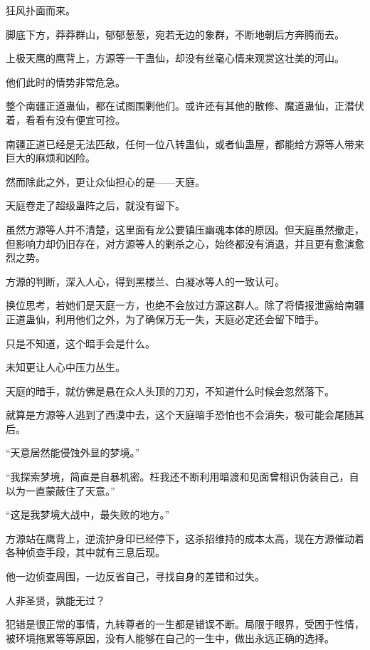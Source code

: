 
\begin{this_body}



狂风扑面而来。

脚底下方，莽莽群山，郁郁葱葱，宛若无边的象群，不断地朝后方奔腾而去。

上极天鹰的鹰背上，方源等一干蛊仙，却没有丝毫心情来观赏这壮美的河山。

他们此时的情势非常危急。

整个南疆正道蛊仙，都在试图围剿他们。或许还有其他的散修、魔道蛊仙，正潜伏着，看看有没有便宜可捡。

南疆正道已经是无法匹敌，任何一位八转蛊仙，或者仙蛊屋，都能给方源等人带来巨大的麻烦和凶险。

然而除此之外，更让众仙担心的是——天庭。

天庭卷走了超级蛊阵之后，就没有留下。

虽然方源等人并不清楚，这里面有龙公要镇压幽魂本体的原因。但天庭虽然撤走，但影响力却仍旧存在，对方源等人的剿杀之心，始终都没有消退，并且更有愈演愈烈之势。

方源的判断，深入人心，得到黑楼兰、白凝冰等人的一致认可。

换位思考，若她们是天庭一方，也绝不会放过方源这群人。除了将情报泄露给南疆正道蛊仙，利用他们之外，为了确保万无一失，天庭必定还会留下暗手。

只是不知道，这个暗手会是什么。

未知更让人心中压力丛生。

天庭的暗手，就仿佛是悬在众人头顶的刀刃，不知道什么时候会忽然落下。

就算是方源等人逃到了西漠中去，这个天庭暗手恐怕也不会消失，极可能会尾随其后。

“天意居然能侵蚀外显的梦境。”

“我探索梦境，简直是自暴机密。枉我还不断利用暗渡和见面曾相识伪装自己，自以为一直蒙蔽住了天意。”

“这是我梦境大战中，最失败的地方。”

方源站在鹰背上，逆流护身印已经停下，这杀招维持的成本太高，现在方源催动着各种侦查手段，其中就有三息后现。

他一边侦查周围，一边反省自己，寻找自身的差错和过失。

人非圣贤，孰能无过？

犯错是很正常的事情，九转尊者的一生都是错误不断。局限于眼界，受困于性情，被环境拖累等等原因，没有人能够在自己的一生中，做出永远正确的选择。


\end{this_body}
